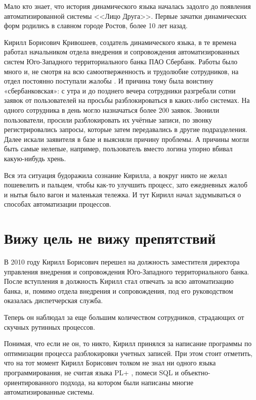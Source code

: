 \documentclass[../index.tex]{subfiles}
\begin{document}
Мало кто знает, что история динамического языка началась задолго до появления автоматизированной системы <<Лицо Друга>>. Первые зачатки динамических форм родились в славном городе Ростов, более 10 лет назад.


Кирилл Борисович Кривошеев, создатель динамического языка,  в те времена работал начальником отдела внедрения и сопровождения автоматизированных систем Юго-Западного территориального банка ПАО Сбербанк. Работы было много и, не смотря на всю самоотверженность и трудолюбие сотрудников, на отдел постоянно поступали жалобы . И причина тому была воистину «сбербанковская»: с утра и до позднего вечера сотрудники разгребали сотни заявок от пользователей на просьбы разблокироваться в каких-либо системах. На одного сотрудника в день могло назначаться более 200 заявок. Звонили пользователи, просили разблокировать их учётные записи, по звонку регистрировались запросы, которые затем передавались в другие подразделения. Далее искали заявителя в базе и выясняли причину проблемы. А причины могли быть самые нелепые, например, пользователь вместо логина упорно вбивал какую-нибудь хрень.


Вся эта ситуация будоражила сознание Кирилла, а вокруг никто не желал пошевелить и пальцем, чтобы как-то улучшить процесс, зато ежедневных жалоб и нытья было вагон и маленькая тележка. 
И тут Кирилл начал задумываться о способах автоматизации процессов.

\section{Вижу цель не вижу препятствий}

В 2010 году Кирилл Борисович перешел на должность заместителя директора управления внедрения и сопровождения Юго-Западного территориального банка. После вступления в должность Кирилл стал отвечать за всю автоматизацию банка, и, помимо отдела внедрения и сопровождения, под его руководством оказалась диспетчерская служба.

Теперь он наблюдал за еще большим количеством сотрудников, страдающих от скучных рутинных процессов. 


Понимая, что если не он, то никто, Кирилл принялся за написание программы по оптимизации процесса разблокировки учетных записей. При этом стоит отметить, что на тот момент Кирилл Борисович толком не знал ни одного языка программирования, не считая языка PL+ , помеси SQL и объектно-ориентированного подхода, на котором были написаны многие автоматизированные системы. 
\end{document}
